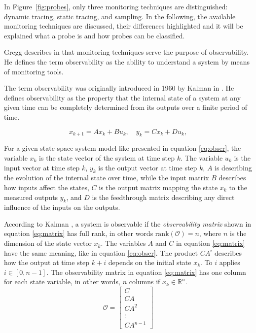 In Figure~\ref{fig:probes}, only three monitoring techniques are distinguished: dynamic tracing, static tracing, and sampling.  
In the following, the available monitoring techniques are discussed, their differences highlighted and it will be explained what a probe is and how probes can be classified.  

Gregg describes in \cite[Chap.~1.2]{Gregg_2020} that monitoring techniques serve the purpose of observability.  
He defines the term observability as the ability to understand a system by means of monitoring tools.  

The term observability was originally introduced in 1960 by Kalman in \cite{Klmn1960ContributionsTT}.  
He defines observability as the property that the internal state of a system at any given time can be completely determined from its outputs over a finite period of time.  

\begin{equation} \label{eq:obser}
x_{k+1} = A x_k + B u_k, \quad y_k = C x_k + D u_k,
\end{equation} 

For a given state-space system model like presented in equation \ref{eq:obser}, the variable $x_k$ is the state vector of the system at time step $k$.
The variable $u_k$ is the input vector at time step $k$,  
$y_k$ is the output vector at time step $k$,  
$A$ is describing the evolution of the internal state over time,  
while the input matrix $B$ describes how inputs affect the states,  
$C$ is the output matrix mapping the state $x_k$ to the measured outputs $y_k$,  
and $D$ is the feedthrough matrix describing any direct influence of the inputs on the outputs.  

According to Kalman \cite{Klmn1960ContributionsTT}, a system is observable if the \emph{observability matrix} shown in equation \ref{eq:matrix} has full rank, in other words \(\mathrm{rank}(\mathcal{O}) = n\), where \(n\) is the dimension of the state vector \(x_k\).  
The variables $A$ and $C$ in equation \ref{eq:matrix} have the same meaning, like in equation \ref{eq:obser}.
The product $C A^i$ describes how the output at time step $k+i$ depends on the initial state $x_k$.
To $i$ applies $i \in [0, n-1]$.
The observability matrix in equation \ref{eq:matrix} has one column for each state variable, in other words, $n$ columns if $x_k \in \mathbb{R}^n$.
\begin{equation} \label{eq:matrix}
\mathcal{O} =
\begin{bmatrix}
C \\
C A \\
C A^2 \\
\vdots \\
C A^{n-1}
\end{bmatrix}
\end{equation}  

